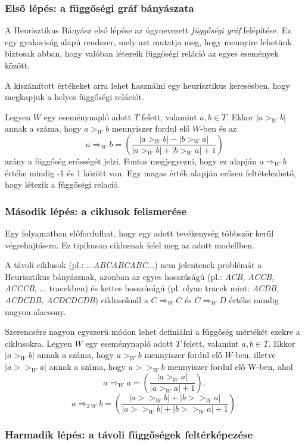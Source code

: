 \subsubsection{Első lépés: a függőségi gráf bányászata}

 A Heurisztikus Bányász első lépése az úgynevezett \textit{függőségi gráf} felépítése. Ez egy gyakoriság alapú rendszer, mely azt mutatja meg, hogy mennyire lehetünk biztosak abban, hogy valóban létezeik függőségi reláció az egyes események között.

A kiszámított értékeket arra lehet használni egy heurisztikus keresésben, hogy megkapjuk a helyes függőségi relációt.

Legyen $W$ egy eseménynapló adott $T$ felett, valamint $a,b \in T$. Ekkor $|a>_W b|$ annak a száma, hogy $a>_Wb$ mennyiszer fordul elő $W$-ben és az
\[
a \Rightarrow_W b = \left(\frac{|a>_Wb|-|b>_Wa|}{|a>_Wb|+|b>_Wa|+1}\right)
\]
arány a függőség erősségét jelzi. Fontos megjegyezni, hogy ez alapján $a\Rightarrow_Wb$ értéke mindig -1 és 1 között van. Egy magas érték alapján erősen feltételezhető, hogy létezik a függőségi relacíó.

\subsubsection{Második lépés: a ciklusok felismerése}

Egy folyamatban előfordulhat, hogy egy adott tevékenység többször kerül végrehajtás\hyp{}ra. Ez tipikusan ciklusnak felel meg az adott modellben.

A távoli ciklusok (pl.: ...\textit{ABCABCABC}...) nem jelentenek problémát a Heurisztikus bányásznak, azonban az egyes hosszúságú (pl.: \textit{ACB, ACCB, ACCCB}, ... tracekben) és kettes hosszúságú (pl. olyan tracek mint: \textit{ACDB, ACDCDB, ACDCDCDB}) ciklusoknál a $C\Rightarrow_WC$ és $C\Rightarrow_WD$ értéke mindig nagyon alacsony.

Szerencsére nagyon egyszerű módon lehet definiálni a függőség mértékét ezekre a ciklusokra. Legyen $W$ egy eseménynapló adott $T$ felett, valamint $a,b \in T$. Ekkor $|a>_W b|$ annak a száma, hogy $a>_Wb$ mennyiszer fordul elő $W$-ben, illetve $|a>>_Wa|$ annak a száma, hogy $a>>_Wb$ mennyiszer fordul elő W-ben, ahol
\[
a\Rightarrow_Wa=\left(\frac{|a>_Wa|}{|a>_Wa|+1}\right),
\]
\[
a\Rightarrow_{2\ W} b=\left(\frac{|a>>_Wb|+|b>>_Wa|}{|a>>_Wb|+|b>>_Wa|+1}\right).
\]

\subsubsection{Harmadik lépés: a távoli függőségek feltérképezése}

